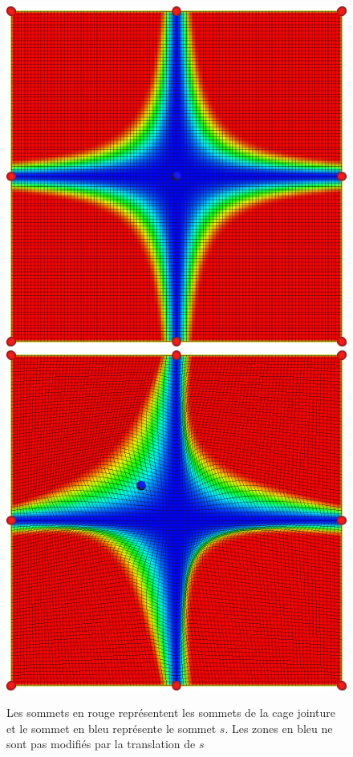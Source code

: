 \begin{figure}[h]
  \begin{center}
    \includegraphics[scale=0.35]{starCage-jointure}
    \includegraphics[scale=0.35]{starCage-jointure-deformation}
    \caption{Les sommets en rouge représentent les sommets de la cage
      jointure et le sommet en bleu représente le sommet $s$. Les
      zones en bleu ne sont pas modifiés par la translation de $s$}
    \label{MELjoi}
  \end{center}
\end{figure}



